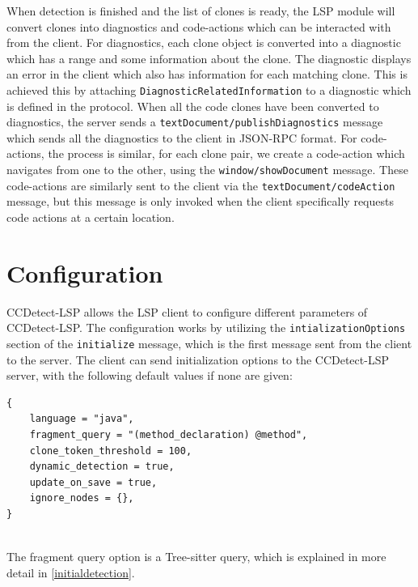When detection is finished and the list of clones is ready, the LSP module will convert
clones into diagnostics and code-actions which can be interacted with from the client. For
diagnostics, each clone object is converted into a diagnostic which has a range and some
information about the clone. The diagnostic displays an error in the client which also has
information for each matching clone. This is achieved this by attaching
\verb|DiagnosticRelatedInformation| to a diagnostic which is defined in the protocol. When
all the code clones have been converted to diagnostics, the server sends a
\verb|textDocument/publishDiagnostics| message which sends all the diagnostics to the
client in JSON-RPC format. For code-actions, the process is similar, for each clone pair,
we create a code-action which navigates from one to the other, using the
\verb|window/showDocument| message. These code-actions are similarly sent to the client
via the \verb|textDocument/codeAction| message, but this message is only invoked when the
client specifically requests code actions at a certain location.

\section{Configuration}
\label{configuration}

CCDetect-LSP allows the LSP client to configure different parameters of CCDetect-LSP. The
configuration works by utilizing the \verb|intializationOptions| section of the
\verb|initialize| message, which is the first message sent from the client to the server.
The client can send initialization options to the CCDetect-LSP server, with the following
default values if none are given:

\begin{lstlisting}
{
    language = "java",
    fragment_query = "(method_declaration) @method",
    clone_token_threshold = 100,
    dynamic_detection = true,
    update_on_save = true,
    ignore_nodes = {},
}


\end{lstlisting}

The fragment query option is a Tree-sitter query, which is explained in more detail in
\cref{initialdetection}.
